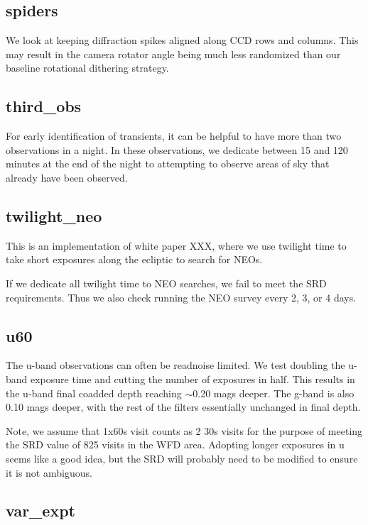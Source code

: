 \subsection{spiders}

We look at keeping diffraction spikes aligned along CCD rows and columns. This may result in the camera rotator angle being much less randomized than our baseline rotational dithering strategy.

\subsection{third\_obs}

For early identification of transients, it can be helpful to have more than two observations in a night. In these observations, we dedicate between 15 and 120 minutes at the end of the night to attempting to observe areas of sky that already have been observed.

\subsection{twilight\_neo}

This is an implementation of white paper XXX, where we use twilight time to take short exposures along the ecliptic to search for NEOs. 

If we dedicate all twilight time to NEO searches, we fail to meet the SRD requirements. Thus we also check running the NEO survey every 2, 3, or 4 days.

\subsection{u60}\label{ss:u60}
The u-band observations can often be readnoise limited. We test doubling the u-band exposure time and cutting the number of exposures in half. This results in the u-band final coadded depth reaching $\sim$0.20 mags deeper. The g-band is also 0.10 mags deeper, with the rest of the filters essentially unchanged in final depth.

Note, we assume that 1x60s visit counts as 2 30s visits for the purpose of meeting the SRD value of 825 visits in the WFD area. Adopting longer exposures in u seems like a good idea, but the SRD will probably need to be modified to ensure it is not ambiguous.

\subsection{var\_expt}

